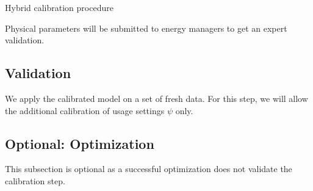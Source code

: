 \documentclass[10pt,a4paper]{report}
\begin{document}
\begin{algorithm}
	\caption{Hybrid calibration procedure}
\end{algorithm}

Physical parameters will be submitted to energy managers to get an expert validation.

\subsection{Validation}
We apply the calibrated model on a set of fresh data.
For this step, we will allow the additional calibration of usage settings $\psi$ only.

\subsection{Optional: Optimization}
This subsection is optional as a successful optimization does not validate the calibration step.
\end{document}
